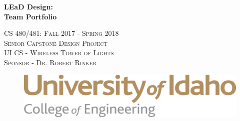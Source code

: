 \documentclass[12pt]{article}
\begin{document}
	\begin{titlepage}
		\centering	
    
    \begin{figure}[h]
      \centering
    \end{figure} 
  
  {\huge\bfseries \textcolor{myRed}{L}\textcolor{myGreen}{E}a\textcolor{myBlue}{D} Design: \\ Team Portfolio\par}
    
    \title{}
    \date{\vspace{-5ex}} %
    \author{%
    	\\Budget Director\\
    	\and {}\\Documenter\\
    	\and \\ \\Client Liaison\\
    	\and \\ \\Designer\\
    }
    \let\newpage\relax\maketitle %
    \maketitle		
    
    \vspace{4cm} 
    
    {\scshape\Large 
      CS 480/481: Fall 2017 - Spring 2018 \\
      Senior Capstone Design Project \\ 
      UI CS - Wireless Tower of Lights \\
      Sponsor - Dr. Robert Rinker
      \par}
    
     \vspace{4cm} 
    
    \begin{figure}[h]
      \centering
      \includegraphics[width=0.7\linewidth]{assets/uislogan.png}
    \end{figure} 
  
		\vfill		
	\end{titlepage}
\end{document}

